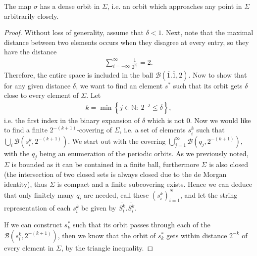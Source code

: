 \begin{proposition}[]
	The map $\sigma$ has a dense orbit in $\Sigma$, i.e. an orbit which approaches any point in $\Sigma$ arbitrarily closely.
\end{proposition}
\begin{proof}
Without loss of generality, assume that $\delta<1$. Next, note that the maximal distance between two elements occurs when they disagree at every entry, so they have the distance
\begin{align}
	\sum_{i=-\infty }^{\infty } \frac{1}{2^{|i|}} = 2.
\end{align}
Therefore, the entire space is included in the ball $\mathcal{B}\left( \overline{1}\bm{.} \overline{1}, 2\right)$. Now to show that for any given distance $\delta $, we want to find an element $s^{*}$ such that its orbit gets $\delta$ close to every element of $\Sigma$. Let 
\begin{align}
k = \min \left\{ j \in \mathbb{N}:\ 2^{-j}\leq \delta\right\},
\end{align}
i.e. the first index in the binary expansion of $\delta$ which is not $0$. Now we would like to find a finite $2^{-(k+1)}$-covering of $\Sigma$, i.e. a set of elements $s_i^{k}$ such that $\bigcup_{i}\mathcal{B}\left(s_i^{k}, 2^{-(k+1)}\right)$. We start out with the covering $\bigcup_{j=1}^{\infty }\mathcal{B}\left(q_j, 2^{-(k+1)}\right)$, with the $q_j$ being an enumeration of the periodic orbits. As we previously noted, $\Sigma$ is bounded as it can be contained in a finite ball, furthermore $\Sigma$ is also closed (the intersection of two closed sets is always closed due to the de Morgan identity), thus $\Sigma$ is compact and a finite subcovering exists. Hence we can deduce that only finitely many $q_i$ are needed, call these $\left(s_i^{k}\right)_{i=1}^{N}$, and let the string representation of each $s_{i}^{k}$ be given by $\overline{S_{i}^{k}}\bm{.} \overline{S_{i}^{k}}$. 

If we can construct $s_{k}^{*}$ such that its orbit passes through each of the $\mathcal{B}\left(s_i^{k}, 2^{-(k+1)}\right)$, then we know that the orbit of $s_{k}^{*}$ gets within distance $2^{-k}$ of every element in $\Sigma$, by the triangle inequality. 


\end{proof}
